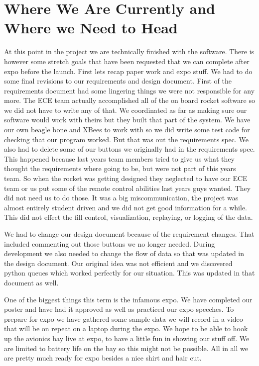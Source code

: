 \documentclass[10pt,draftclsnofoot,onecolumn]{IEEEtran}
\begin{document}
\section{Where We Are Currently and Where we Need to Head}
At this point in the project we are technically finished with the software. There is however some stretch goals that have been requested that we can complete after expo before the launch. First lets recap paper work and expo stuff. We had to do some final revisions to our requirements and design document. First of the requirements document had some lingering things we were not responsible for any more. The ECE team actually accomplished all of the on board rocket software so we did not have to write any of that. We coordinated as far as making sure our software would work with theirs but they built that part of the system. We have our own beagle bone and XBees to work with so we did write some test code for checking that our program worked. But that was out the requirements spec. We also had to delete some of our buttons we originally had in the requirements spec. This happened because last years team members tried to give us what they thought the requirements where going to be, but were not part of this years team. So when the rocket was getting designed they neglected to have our ECE team or us put some of the remote control abilities last years guys wanted. They did not need us to do those. It was a big miscommunication, the project was almost entirely student driven and we did not get good information for a while. This did not effect the fill control, visualization, replaying, or logging of the data. \par

We had to change our design document because of the requirement changes. That included commenting out those buttons we no longer needed. During development we also needed to change the flow of data so that was updated in the design document. Our original idea was not efficient and we discovered python queues which worked perfectly for our situation. This was updated in that document as well.\par

One of the biggest things this term is the infamous expo. We have completed our poster and have had it approved as well as practiced our expo speeches. To prepare for expo we have gathered some sample data we will record in a video that will be on repeat on a laptop during the expo. We hope to be able to hook up the avionics bay live at expo, to have a little fun in showing our stuff off. We are limited to battery life on the bay so this might not be possible. All in all we are pretty much ready for expo besides a nice shirt and hair cut. \par
\end{document}

